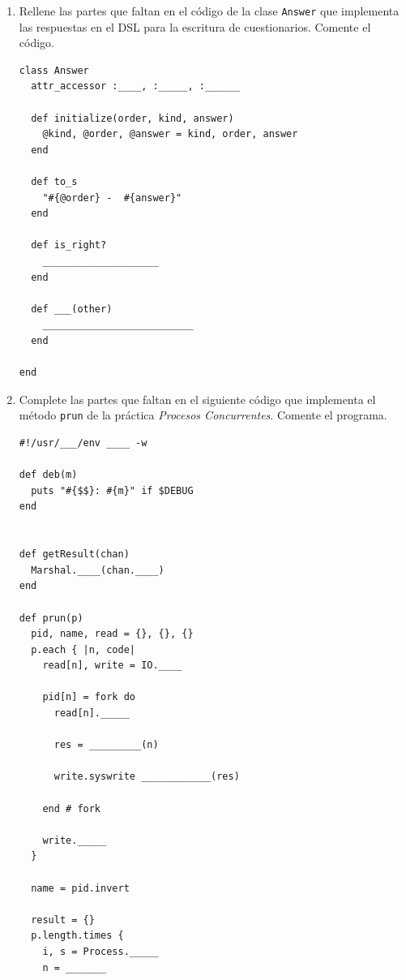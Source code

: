 \begin{enumerate}
\begin{verbatim}
  def initialize(text, answers)
    @text = text
    @answers = answers.map { |k, v| _________________________________ }.sort
  end

  def to_s
    output = <<"EORECIPE"
#{_____}

#{
    out = ""
    @answers.each do |answer|
      out << "  #{answer}\n"
    end
    ___
}
EORECIPE
  end

  def ask
    begin
      puts self
      print "Su respuesta: " 
      answerno = gets.to_i - 1
    end while (answerno < 0 or answerno >= @_______.______)
    @answers[________].is_right? 
  end

end
\end{verbatim}
\item Rellene las partes que faltan en el código de la clase \verb|Answer| que implementa las respuestas
en el DSL para la escritura de cuestionarios.
Comente el código.
\begin{verbatim}
class Answer
  attr_accessor :____, :_____, :______

  def initialize(order, kind, answer)
    @kind, @order, @answer = kind, order, answer
  end

  def to_s
    "#{@order} -  #{answer}"
  end

  def is_right?
    ____________________
  end

  def ___(other)
    __________________________
  end

end
\end{verbatim}
\item
Complete las partes que faltan en el siguiente código que implementa el método
\verb|prun| de la práctica {\it Procesos Concurrentes}.
Comente el programa.
\begin{verbatim}
#!/usr/___/env ____ -w

def deb(m) 
  puts "#{$$}: #{m}" if $DEBUG
end


def getResult(chan)
  Marshal.____(chan.____)
end
  
def prun(p)
  pid, name, read = {}, {}, {}
  p.each { |n, code|
    read[n], write = IO.____

    pid[n] = fork do
      read[n]._____

      res = _________(n)

      write.syswrite ____________(res)

    end # fork

    write._____
  }

  name = pid.invert
  
  result = {}
  p.length.times { 
    i, s = Process._____ 
    n = _______


\end{verbatim}
\end{enumerate}

